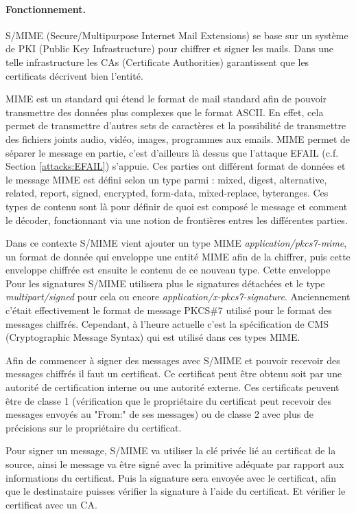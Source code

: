 \paragraph*{Fonctionnement.}
S/MIME (Secure/Multipurpose Internet Mail Extensions) se base sur un système de PKI (Public Key Infrastructure) pour chiffrer et signer les mails. Dans une telle infrastructure les CAs (Certificate Authorities) garantissent que les certificats décrivent bien l'entité.

MIME est un standard qui étend le format de mail standard afin de pouvoir transmettre des données plus complexes que le format ASCII. En effet, cela permet de transmettre d'autres sets de caractères et la possibilité de transmettre des fichiers joints audio, vidéo, images, programmes aux emails. MIME permet de séparer le message en partie, c'est d'ailleurs là dessus que l'attaque EFAIL (c.f. Section \ref{attacks:EFAIL}) s'appuie. Ces parties ont différent format de données et le message MIME est défini selon un type parmi : mixed, digest, alternative, related, report, signed, encrypted, form-data, mixed-replace, byteranges. Ces types de contenu sont là pour définir de quoi est composé le message et comment le décoder, fonctionnant via une notion de frontières entres les différentes parties.

Dans ce contexte S/MIME vient ajouter un type MIME \textit{application/pkcs7-mime}, un format de donnée qui enveloppe une entité MIME afin de la chiffrer, puis cette enveloppe chiffrée est ensuite le contenu de ce nouveau type. Cette enveloppe  Pour les signatures S/MIME utilisera plus le signatures détachées et le type \textit{multipart/signed} pour cela ou encore \textit{application/x-pkcs7-signature}. Anciennement c'était effectivement le format de message PKCS\#7 utilisé pour le format des messages chiffrés. Cependant, à l'heure actuelle c'est la spécification de CMS (Cryptographic Message Syntax) qui est utilisé dans ces types MIME.

Afin de commencer à signer des messages avec S/MIME et pouvoir recevoir des messages chiffrés il faut un certificat. Ce certificat peut être obtenu soit par une autorité de certification interne ou une autorité externe. Ces certificats peuvent être de classe 1 (vérification que le propriétaire du certificat peut recevoir des messages envoyés au "From:" de ses messages) ou de classe 2 avec plus de précisions sur le propriétaire du certificat.

Pour signer un message, S/MIME va utiliser la clé privée lié au certificat de la source, ainsi le message va être signé avec la primitive adéquate par rapport aux informations du certificat. Puis la signature sera envoyée avec le certificat, afin que le destinataire puisses vérifier la signature à l'aide du certificat. Et vérifier le certificat avec un CA.

